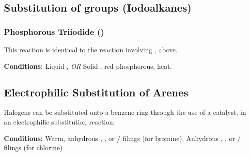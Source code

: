 		\pagebreak
		\subsection{Substitution of  groups (Iodoalkanes)}

			\subsubsection{Phosphorous Triiodide ()}

				This reaction is identical to the reaction involving , above.

				\vspace{1.5em}
				\vbox{\textbf{Conditions:}	\tabto{35mm}Liquid , \textit{OR}
											\tabto{35mm}Solid , {\color{Red}red} phosphorous, heat.}





		\subsection{Electrophilic Substitution of Arenes}

			Halogens can be substituted onto a benzene ring through the use of a catalyst, in an electrophilic substitution reaction.

			\vspace{1.5em}
			\vbox{\textbf{Conditions:}	\tabto{35mm}Warm, anhydrous , , or  /
										\ch{\aluminium} filings (for bromine),
										\tabto{35mm}Anhydrous , , or
													 / \ch{\aluminium} filings (for chlorine)}\vspace{0.5em}

